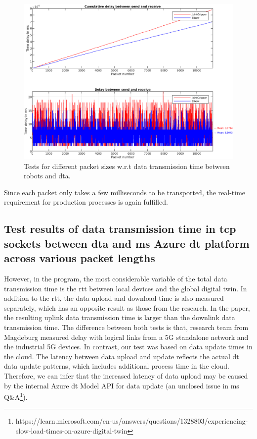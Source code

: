 \begin{figure}[htb]
    \centering
    \includegraphics[width=\textwidth]{figures/tests/DT/Delay_SendReceive_JointGripper_Elbow.png}
    \caption{Tests for different packet sizes w.r.t data transmission time between robots 
    and \gls{dta}. \label{fig: SR-JointGripper-Elbow}}
\end{figure}

Since each packet only takes a few milliseconds to be transported, the real-time 
requirement for production processes is again fulfilled. 



\subsection{Test results of data transmission time in \gls{tcp} sockets between \gls{dta} 
and \gls{ms} Azure \gls{dt} platform across various packet lengths} \label{chap: Result-DTA-DT}

However, in the program, the most considerable variable of 
the total data transmission time is the \gls{rtt} between local devices and the global digital 
twin. In addition to the \gls{rtt}, the data upload and download time is also measured 
separately, which has an opposite result as those from the research\cite{cainelli_performance_2023}. 
In the paper, the resulting uplink data transmission time is larger than the downlink 
data transmission time. The difference between both tests is that, research team from 
Magdeburg measured delay with logical links from a 5G standalone network and the industrial 
5G devices. In contrast, our test was based on data update times in the cloud. The latency 
between data upload and update reflects the actual \gls{dt} data update patterns, 
which includes additional process time in the cloud. Therefore, we can infer that the 
increased latency of data upload may be caused by the internal Azure \gls{dt} Model 
API for data update (an unclosed issue in \gls{ms} Q\&A\footnote[1]{https://learn.microsoft.com/en-us/answers/questions/1328803/experiencing-slow-load-times-on-azure-digital-twin}).
    

